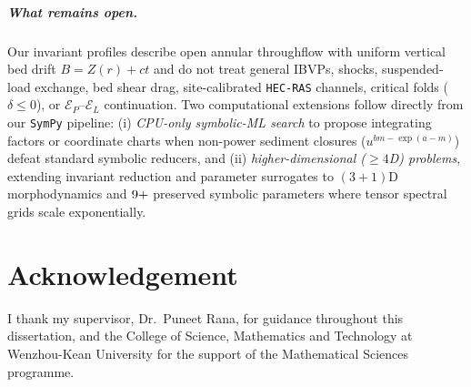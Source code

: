 \documentclass[12pt,a4paper,oneside]{report}
\numberwithin{equation}{chapter}
\theoremstyle{definition}
\theoremstyle{remark}\newtheorem{remark}[theorem]{Remark}
\begin{document}
\paragraph{What remains open.}
Our invariant profiles describe open annular throughflow with uniform vertical bed drift $B=Z(r)+ct$ and do not treat general IBVPs, shocks, suspended-load exchange, bed shear drag, site-calibrated \texttt{HEC-RAS} channels, critical folds ($\delta\le0$), or $\mathcal E_P$--$\mathcal E_L$ continuation. Two computational extensions follow directly from our \texttt{SymPy} pipeline: (i) \emph{CPU-only symbolic-ML search} to propose integrating factors or coordinate charts when non-power sediment closures ($u^{bm-\exp(a-m)}$) defeat standard symbolic reducers, and (ii) \emph{higher-dimensional ($\ge4$D) problems}, extending invariant reduction and parameter surrogates to $(3+1)$D morphodynamics and $9+$ preserved symbolic parameters where tensor spectral grids scale exponentially.

\chapter*{Acknowledgement}
I thank my supervisor, Dr.\ Puneet Rana, for guidance throughout this dissertation, and the College of Science, Mathematics and Technology at Wenzhou-Kean University for the support of the Mathematical Sciences programme.
\end{document}
